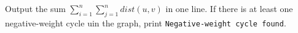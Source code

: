 Output the sum $\sum_{i=1}^{n} \sum_{j=1}^{n} dist(u, v)$ in one line.
If there is at least one negative-weight cycle uin the graph, print \texttt{Negative-weight cycle found}.